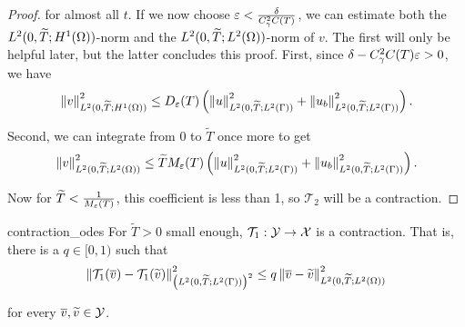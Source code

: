 \begin{proof}
    \noindent
    for almost all $t$. If we now choose $\varepsilon < \frac{\delta}{C_\gamma^2 C(T)}$, we can estimate both the $L^2(0, \widetilde{T}; H^1(\Omega))$-norm and the $L^2(0, \widetilde{T}; L^2(\Omega))$-norm of $v$. The first will only be helpful later, but the latter concludes this proof. First, since $\delta - C_\gamma^2 C(T) \varepsilon > 0$, we have
%
    \begin{equation}\label{eq:extra_estimate}
    \begin{aligned}
        \left\| v \right\|_{L^2(0, \widetilde{T}; H^1(\Omega))}^2 \leq D_\varepsilon(T) \left(\left\| u \right\|_{L^2(0, \widetilde{T}; L^2(\Gamma))}^2 + \left\| u_b \right\|_{L^2(0, \widetilde{T}; L^2(\Gamma))}^2\right) .
    \end{aligned}
    \end{equation}

    \noindent
    Second, we can integrate from 0 to $\widetilde{T}$ once more to get
%
    \begin{equation*}
        \left\| v \right\|_{L^2(0, \widetilde{T}; L^2(\Omega))}^2 \leq \widetilde{T} M_\varepsilon(T) \left(\left\| u \right\|_{L^2(0, \widetilde{T}; L^2(\Gamma))}^2 + \left\| u_b \right\|_{L^2(0, \widetilde{T}; L^2(\Gamma))}^2\right).
    \end{equation*}

    \noindent
    Now for $\widetilde{T} < \frac{1}{M_\varepsilon(T)}$, this coefficient is less than 1, so $\mathcal{T}_2$ will be a contraction.
\end{proof}

\begin{lemma}{}{contraction_odes}
    For $\widetilde{T} > 0$ small enough, $\mathcal{T}_{1}: \mathcal{Y} \to \mathcal{X}$ is a contraction. That is, there is a $q \in [0, 1)$ such that
    \begin{equation*}
        \left\| \mathcal{T}_{1} (\overline{v}) - \mathcal{T}_{1} (\widetilde{v}) \right\|_{\left(L^2(0, \widetilde{T}; L^2(\Gamma))\right)^2}^2 \leq q \left\| \overline{v} - \widetilde{v} \right\|_{L^2(0, \widetilde{T}; L^2(\Omega))}^2
    \end{equation*}

    for every $\overline{v}, \widetilde{v} \in \mathcal{Y}$.
\end{lemma}

